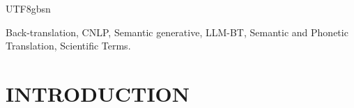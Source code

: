 \documentclass[conference]{IEEEtran}
\begin{document}
\begin{CJK*}{UTF8}{gbsn}
\begin{abstract}
\end{abstract}

\begin{IEEEkeywords}
Back-translation, CNLP, Semantic generative, LLM-BT, Semantic and Phonetic Translation, Scientific Terms.
\end{IEEEkeywords}

\section{INTRODUCTION}


\end{CJK*}
\end{document}
